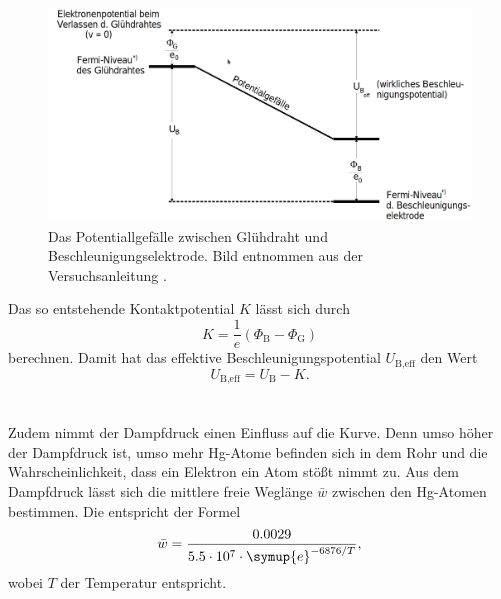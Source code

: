 \begin{figure}
    \centering
    \includegraphics[width=\textwidth]{content/data/Potentialgefaelle.png}
    \caption{Das Potentiallgefälle zwischen Glühdraht und Beschleunigungselektrode. Bild entnommen aus der Versuchsanleitung \cite[5]{anleitung}.}
    \label{fig:potential}
\end{figure}
Das so entstehende Kontaktpotential $K$ lässt sich durch 
\begin{equation}
    K = \frac{1}{e} \left ( \Phi_\text{B} - \Phi_\text{G} \right)
    \label{eq:kontaktpotential}
\end{equation}
berechnen.
Damit hat das effektive Beschleunigungspotential $U_\text{B,eff}$ den Wert
\begin{equation}
    U_\text{B,eff} = U_\text{B} - K.
    \label{eq:beschleunigungeffektiv}
\end{equation}
\\\\
Zudem nimmt der Dampfdruck einen Einfluss auf die Kurve.
Denn umso höher der Dampfdruck ist, umso mehr Hg-Atome befinden sich in dem Rohr und die Wahrscheinlichkeit, dass ein Elektron ein Atom stößt nimmt zu.
Aus dem Dampfdruck lässt sich die mittlere freie Weglänge $\bar{w}$ zwischen den Hg-Atomen bestimmen.
Die entspricht der Formel
\begin{equation}
    \bar{w} = \frac{0.0029}{5.5\cdot10^7 \cdot \symup{e}^{-6876/T} },
\end{equation}
wobei $T$ der Temperatur entspricht.



